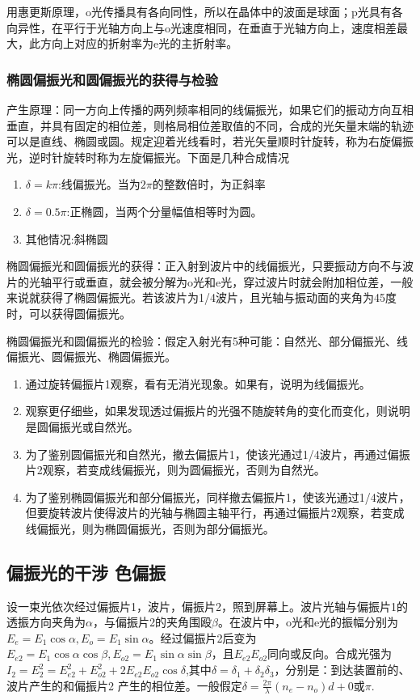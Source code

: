 用惠更斯原理，o光传播具有各向同性，所以在晶体中的波面是球面；p光具有各向异性，在平行于光轴方向上与o光速度相同，在垂直于光轴方向上，速度相差最大，此方向上对应的折射率为e光的主折射率。{\color{red}{惠更斯作图法一定要掌握！}}
\subsubsection{椭圆偏振光和圆偏振光的获得与检验}
产生原理：同一方向上传播的两列频率相同的线偏振光，如果它们的振动方向互相垂直，并具有固定的相位差，则格局相位差取值的不同，合成的光矢量末端的轨迹可以是直线、椭圆或圆。规定迎着光线看时，若光矢量顺时针旋转，称为右旋偏振光，逆时针旋转时称为左旋偏振光。下面是几种合成情况
\begin{enumerate}
    \item $\delta = k \pi$:线偏振光。当为$2 \pi$的整数倍时，为正斜率
    \item $\delta = 0.5 \pi$:正椭圆，当两个分量幅值相等时为圆。
    \item 其他情况:斜椭圆
\end{enumerate}
椭圆偏振光和圆偏振光的获得：正入射到波片中的线偏振光，只要振动方向不与波片的光轴平行或垂直，就会被分解为o光和e光，穿过波片时就会附加相位差，一般来说就获得了椭圆偏振光。若该波片为1/4波片，且光轴与振动面的夹角为45度时，可以获得圆偏振光。

椭圆偏振光和圆偏振光的检验：假定入射光有5种可能：自然光、部分偏振光、线偏振光、圆偏振光、椭圆偏振光。
\begin{enumerate}
    \item 通过旋转偏振片1观察，看有无消光现象。如果有，说明为线偏振光。
    \item 观察更仔细些，如果发现透过偏振片的光强不随旋转角的变化而变化，则说明是圆偏振光或自然光。
    \item 为了鉴别圆偏振光和自然光，撤去偏振片1，使该光通过1/4波片，再通过偏振片2观察，若变成线偏振光，则为圆偏振光，否则为自然光。
    \item 为了鉴别椭圆偏振光和部分偏振光，同样撤去偏振片1，使该光通过1/4波片，但要旋转波片使得波片的光轴与椭圆主轴平行，再通过偏振片2观察，若变成线偏振光，则为椭圆偏振光，否则为部分偏振光。
\end{enumerate}
\subsection{偏振光的干涉 色偏振}
设一束光依次经过偏振片1，波片，偏振片2，照到屏幕上。波片光轴与偏振片1的透振方向夹角为$\alpha$，与偏振片2的夹角围殴$\beta$。在波片中，o光和e光的振幅分别为$E_e=E_1\cos \alpha ,E_o=E_1 \sin \alpha$。经过偏振片2后变为$E_{e2}=E_1\cos \alpha \cos \beta ,E_{o2}=E_1 \sin \alpha \sin \beta$，且$E_{e2}E_{o2}$同向或反向。合成光强为$I_2=E_2^2=E_{e2}^2+E_{o2}^2+2E_{e2}E_{o2}\cos \delta$,其中$\delta = \delta_1+ \delta _2 \delta _3$，分别是：到达装置前的、波片产生的和偏振片2 产生的相位差。一般假定$\delta = \frac{2\pi}{\lambda}(n_e-n_o)d+0$或$\pi$.

